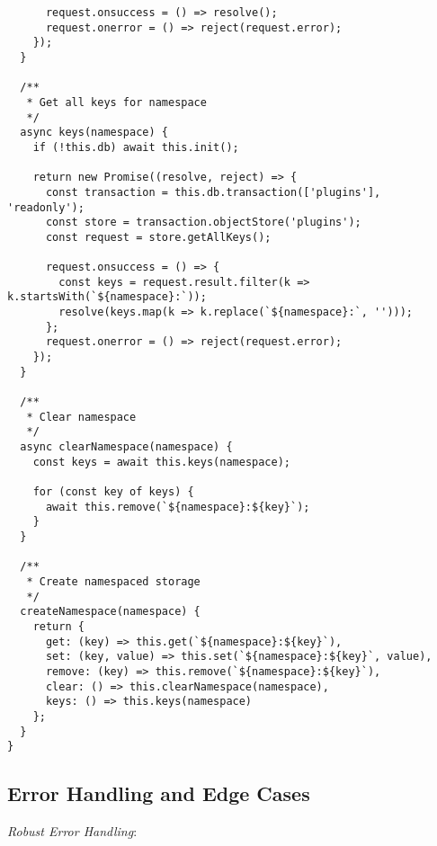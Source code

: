 \documentclass[11pt]{article}
\begin{document}
\begin{verbatim}
      request.onsuccess = () => resolve();
      request.onerror = () => reject(request.error);
    });
  }
  
  /**
   * Get all keys for namespace
   */
  async keys(namespace) {
    if (!this.db) await this.init();
    
    return new Promise((resolve, reject) => {
      const transaction = this.db.transaction(['plugins'], 'readonly');
      const store = transaction.objectStore('plugins');
      const request = store.getAllKeys();
      
      request.onsuccess = () => {
        const keys = request.result.filter(k => k.startsWith(`${namespace}:`));
        resolve(keys.map(k => k.replace(`${namespace}:`, '')));
      };
      request.onerror = () => reject(request.error);
    });
  }
  
  /**
   * Clear namespace
   */
  async clearNamespace(namespace) {
    const keys = await this.keys(namespace);
    
    for (const key of keys) {
      await this.remove(`${namespace}:${key}`);
    }
  }
  
  /**
   * Create namespaced storage
   */
  createNamespace(namespace) {
    return {
      get: (key) => this.get(`${namespace}:${key}`),
      set: (key, value) => this.set(`${namespace}:${key}`, value),
      remove: (key) => this.remove(`${namespace}:${key}`),
      clear: () => this.clearNamespace(namespace),
      keys: () => this.keys(namespace)
    };
  }
}
\end{verbatim}
\subsection{Error Handling and Edge Cases}
\label{sec:org4530124}

\emph{Robust Error Handling}:
\end{document}
